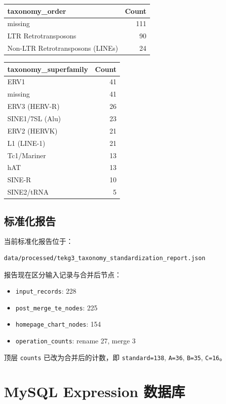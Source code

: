 \documentclass[UTF8]{ctexart}
\begin{document}
\begin{longtable}{lr}
\toprule
taxonomy\_order & Count \\
\midrule
\endhead
missing & 111 \\
LTR Retrotransposons & 90 \\
Non-LTR Retrotransposons (LINEs) & 24 \\
\bottomrule
\end{longtable}

\begin{longtable}{lr}
\toprule
taxonomy\_superfamily & Count \\
\midrule
\endhead
ERV1 & 41 \\
missing & 41 \\
ERV3 (HERV-R) & 26 \\
SINE1/7SL (Alu) & 23 \\
ERV2 (HERVK) & 21 \\
L1 (LINE-1) & 21 \\
Tc1/Mariner & 13 \\
hAT & 13 \\
SINE-R & 10 \\
SINE2/tRNA & 5 \\
\bottomrule
\end{longtable}

\subsection{标准化报告}

当前标准化报告位于：

\begin{verbatim}
data/processed/tekg3_taxonomy_standardization_report.json
\end{verbatim}

报告现在区分输入记录与合并后节点：

\begin{itemize}
  \item \texttt{input\_records}: 228
  \item \texttt{post\_merge\_te\_nodes}: 225
  \item \texttt{homepage\_chart\_nodes}: 154
  \item \texttt{operation\_counts}: rename 27, merge 3
\end{itemize}

顶层 \texttt{counts} 已改为合并后的计数，即 \texttt{standard=138}, \texttt{A=36}, \texttt{B=35}, \texttt{C=16}。

\section{MySQL Expression 数据库}
\end{document}
